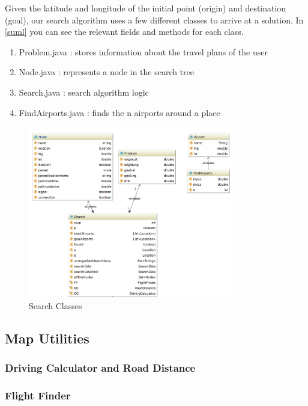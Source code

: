 \documentclass[11pt]{article}
\begin{document}
Given the latitude and longitude of the initial point (origin) and destination (goal), our search algorithm uses a few different classes to arrive at a solution.
In \ref{suml} you can see the relevant fields and methods for each class.
\begin{enumerate}
\item Problem.java : stores information about the travel plans of the user 
\item Node.java : represents a node in the search tree
\item Search.java : search algorithm logic
\item FindAirports.java : finds the n airports around a place
\end{enumerate}

\begin{figure}[!ht]
  \centering
  \includegraphics[width=0.8\textwidth]{searchuml.png}
  \caption{Search Classes}
  \label{fig:suml}
\end{figure}

\pagebreak

\subsection{Map Utilities}

\subsubsection{Driving Calculator and Road Distance}

\subsubsection{Flight Finder}
\end{document}
